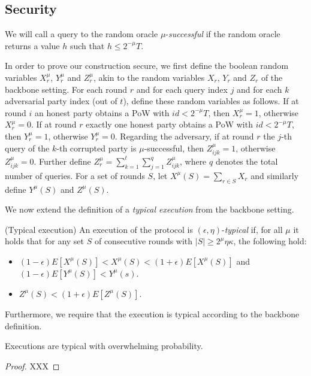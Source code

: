 \subsection{Security}

We will call a query to the random oracle $\mu$-\textit{successful} if the
random oracle returns a value $h$ such that $h \leq 2^{-\mu}T$.

In order to prove our construction secure, we first define the boolean random
variables $X_r^\mu$, $Y_r^\mu$ and $Z_r^\mu$, akin to the random variables
$X_r$, $Y_r$ and $Z_r$ of the backbone setting\cite{backbone}. For each round
$r$ and for each query index $j$ and for each $k$ adversarial party index (out
of $t$), define these random variables as follows.  If at round $i$ an honest
party obtains a PoW with $id < 2^{-\mu}T$, then $X_r^\mu = 1$, otherwise
$X_r^\mu = 0$. If at round $r$ exactly one honest party obtains a PoW with $id <
2^{-\mu}T$, then $Y_r^\mu = 1$, otherwise $Y_r^\mu = 0$. Regarding the
adversary, if at round $r$ the $j$-th query of the $k$-th corrupted party is
$\mu$-successful, then $Z^\mu_{ijk} = 1$, otherwise $Z^\mu_{ijk} = 0$. Further
define $Z^\mu_r = \sum_{k=1}^t \sum_{j=1}^q Z^\mu_{ijk}$, where $q$ denotes the
total number of queries. For a set of rounds $S$, let $X^\mu(S) = \sum_{r \in S}
X_r$ and similarly define $Y^\mu(S)$ and $Z^\mu(S)$.

We now extend the definition of a \textit{typical execution} from the backbone
setting\cite{backbone}.

\begin{definition}{(Typical execution)}
    An execution of the protocol is $(\epsilon, \eta)$-\textit{typical} if, for
    all $\mu$ it holds that for any set $S$ of consecutive rounds with $|S| \geq
    2^\mu \eta\kappa$, the following hold:

    \begin{itemize}
        \item $(1 - \epsilon)E[X^\mu(S)] < X^\mu(S) < (1 + \epsilon)E[X^\mu(S)]$ and $(1 - \epsilon)E[Y^\mu(S)] < Y^\mu(s)$.
        \item $Z^\mu(S) < (1 + \epsilon)E[Z^\mu(S)]$.
    \end{itemize}

    Furthermore, we require that the execution is typical according to the
    backbone definition.
\end{definition}

\begin{theorem}
Executions are typical with overwhelming probability.
\end{theorem}
\begin{proof}
XXX
\end{proof}

